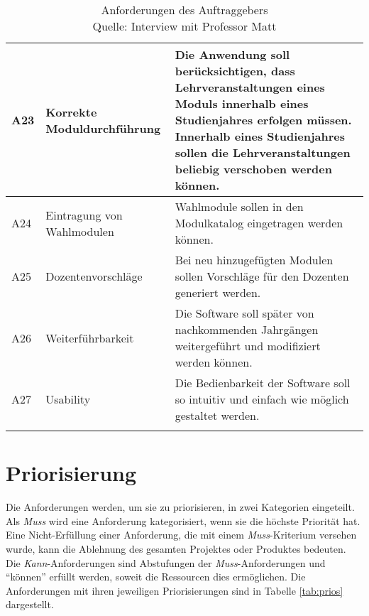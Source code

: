 \begin{longtable}[h]{|p{}|p{4cm}|p{}|}
	\parbox[t]{3cm}{A23} & Korrekte Moduldurchführung  & Die Anwendung soll berücksichtigen, dass Lehrveranstaltungen eines Moduls innerhalb eines Studienjahres erfolgen müssen. Innerhalb eines Studienjahres sollen die Lehrveranstaltungen beliebig verschoben werden können.\\ \hline
	\parbox[t]{3cm}{A24} & Eintragung von Wahlmodulen & Wahlmodule sollen in den Modulkatalog eingetragen werden können.\\ \hline
	\parbox[t]{3cm}{A25} & Dozentenvorschläge & Bei neu hinzugefügten Modulen sollen Vorschläge für den Dozenten generiert werden.\\ \hline
	\parbox[t]{3cm}{A26} & Weiterführbarkeit & Die Software soll später von nachkommenden Jahrgängen weitergeführt und modifiziert werden können.\\ \hline
	\parbox[t]{3cm}{A27} & Usability & Die Bedienbarkeit der Software soll so intuitiv und einfach wie möglich gestaltet werden.\\ \hline
	
	\captionsetup{format=hang}
	\caption[Anforderungen des Auftraggebers]{\label{tab:Anforderungen}Anforderungen des Auftraggebers\\Quelle: Interview mit Professor Matt}
\end{longtable}


\section{Priorisierung}
Die Anforderungen werden, um sie zu priorisieren, in zwei Kategorien eingeteilt.
Als \textit{Muss} wird eine Anforderung kategorisiert, wenn sie die höchste Priorität hat.
Eine Nicht-Erfüllung einer Anforderung, die mit einem \textit{Muss}-Kriterium versehen wurde, kann die Ablehnung des gesamten Projektes oder Produktes bedeuten.
Die \textit{Kann}-Anforderungen sind Abstufungen der \textit{Muss}-Anforderungen und \enquote{können} erfüllt werden, soweit die Ressourcen dies ermöglichen.
Die Anforderungen mit ihren jeweiligen Priorisierungen sind in Tabelle \vref{tab:prios} dargestellt. 

